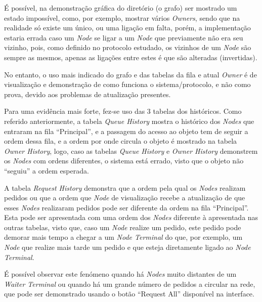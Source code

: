 É possível, na demonstração gráfica do diretório (o grafo) ser mostrado um estado impossível, como, por exemplo, mostrar vários \emph{Owners}, sendo que na realidade só existe um único, ou uma ligação em falta, porém, a implementação estaria errada caso um \emph{Node} se ligar a um \emph{Node} que previamente não era seu vizinho, pois, como definido no protocolo estudado, os vizinhos de um \emph{Node} são sempre as mesmos, apenas as ligações entre estes é que são alteradas (invertidas).

No entanto, o uso mais indicado do grafo e das tabelas da fila e atual \emph{Owner} é de visualização e demonstração de como funciona o sistema/protocolo, e não como prova, devido aos problemas de atualização presentes. 

Para uma evidência mais forte, fez-se uso das 3 tabelas dos históricos. 
Como referido anteriormente, a tabela \emph{Queue History} mostra o histórico dos \emph{Nodes} que entraram na fila ``Principal'', e a passagem do acesso ao objeto tem de seguir a ordem dessa fila, e a ordem por onde circula o objeto é mostrado na tabela \emph{Owner History}, logo, caso as tabelas \emph{Queue History} e \emph{Owner History} demonstrem os \emph{Nodes} com ordens diferentes, o sistema está errado, visto que o objeto não ``seguiu'' a ordem esperada.

A tabela \emph{Request History} demonstra que a ordem pela qual os \emph{Nodes} realizam pedidos ou que a ordem
que \emph{Node} de visualização recebe a atualização de que esses \emph{Nodes} realizaram pedidos pode ser diferente da ordem na fila ``Principal''.
Esta pode ser apresentada com uma ordem dos \emph{Nodes} diferente à apresentada nas outras tabelas, visto que, caso um \emph{Node} realize um pedido, este pedido pode demorar mais tempo a chegar a um \emph{Node Terminal} do que, por exemplo, um \emph{Node} que realize mais tarde um pedido e que esteja diretamente ligado ao \emph{Node Terminal}.

É possível observar este fenómeno quando há \emph{Nodes} muito distantes de um \emph{Waiter Terminal} ou quando há um grande número de pedidos a circular na rede,
que pode ser demonstrado usando o botão ``Request All'' disponível na interface.


